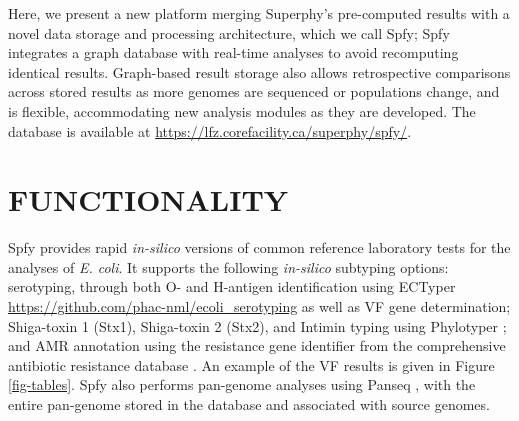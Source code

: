 \documentclass{article}
\begin{document}
Here, we present a new platform merging Superphy's pre-computed results with a novel data storage and processing architecture, which we call Spfy; Spfy integrates a graph database with real-time analyses to avoid recomputing identical results. Graph-based result storage also allows retrospective comparisons across stored results as more genomes are sequenced or populations change, and is flexible, accommodating new analysis modules as they are developed. The database is available at \url{https://lfz.corefacility.ca/superphy/spfy/}.



\enlargethispage{-65.1pt}



\section{FUNCTIONALITY}


Spfy provides rapid \textit{in-silico} versions of common reference laboratory tests for the analyses of \textit{E. coli}. It supports the following \textit{in-silico} subtyping options: serotyping, through both O- and H-antigen identification using ECTyper \url{https://github.com/phac-nml/ecoli_serotyping} as well as VF gene determination; Shiga-toxin 1 (Stx1), Shiga-toxin 2 (Stx2), and Intimin typing using Phylotyper \cite{whiteside2017phylotyper}; and AMR annotation using the resistance gene identifier from the comprehensive antibiotic resistance database \cite{mcarthur2013comprehensive}. An example of the VF results is given in Figure \ref{fig-tables}. Spfy also performs pan-genome analyses using Panseq \cite{laing2010pan}, with the entire pan-genome stored in the database and associated with source genomes.
\end{document}
